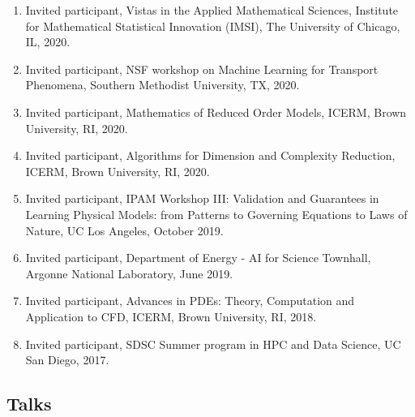 \documentclass[letterpaper]{article}
\begin{document}
\begin{enumerate}
    \item Invited participant, Vistas in the Applied Mathematical Sciences, Institute for Mathematical Statistical Innovation (IMSI),  The University of Chicago, IL, 2020.

    \item Invited participant, NSF workshop on Machine Learning for Transport Phenomena, Southern Methodist University, TX, 2020.

    \item Invited participant, Mathematics of Reduced Order Models, ICERM, Brown University, RI, 2020.

	\item Invited participant, Algorithms for Dimension and Complexity Reduction, ICERM, Brown University, RI, 2020.

    \item Invited participant, IPAM Workshop III: Validation and Guarantees in Learning Physical Models: from Patterns to Governing Equations to Laws of Nature, UC Los Angeles, October 2019.
    
    \item Invited participant, Department of Energy - AI for Science Townhall, Argonne National Laboratory, June 2019.
    
    \item Invited participant, Advances in PDEs: Theory, Computation and Application to CFD, ICERM, Brown University, RI, 2018.
    
    \item Invited participant, SDSC Summer program in HPC and Data Science, UC San Diego, 2017.
\end{enumerate}

\subsection*{Talks}
\end{document}

